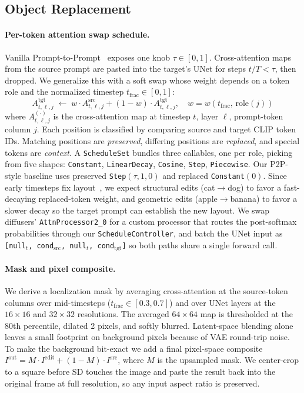 \documentclass[10pt,twocolumn,letterpaper]{article}
\begin{document}
\subsection{Object Replacement}
\label{sec:replace}

\paragraph{Per-token attention swap schedule.}
Vanilla Prompt-to-Prompt~\cite{hertz2022p2p} exposes one knob $\tau \in [0, 1]$. Cross-attention maps from the source prompt are pasted into the target's UNet for steps $t/T < \tau$, then dropped. We generalize this with a soft swap whose weight depends on a token role and the normalized timestep $t_{\text{frac}} \in [0, 1]$:
\begin{equation}
    A^{\text{tgt}}_{t, \ell, j} \;\leftarrow\; w \cdot A^{\text{src}}_{t, \ell, j} + (1 - w) \cdot A^{\text{tgt}}_{t, \ell, j}, \quad w = w(t_{\text{frac}}, \, \text{role}(j))
\label{eq:blend}
\end{equation}
where $A^{(\cdot)}_{t, \ell, j}$ is the cross-attention map at timestep $t$, layer $\ell$, prompt-token column $j$. Each position is classified by comparing source and target CLIP token IDs. Matching positions are \emph{preserved}, differing positions are \emph{replaced}, and special tokens are \emph{context}. A \texttt{ScheduleSet} bundles three callables, one per role, picking from five shapes: \texttt{Constant}, \texttt{LinearDecay}, \texttt{Cosine}, \texttt{Step}, \texttt{Piecewise}. Our P2P-style baseline uses preserved \texttt{Step}$(\tau, 1, 0)$ and replaced \texttt{Constant}$(0)$. Since early timesteps fix layout~\cite{hertz2022p2p}, we expect structural edits (cat$\to$dog) to favor a fast-decaying replaced-token weight, and geometric edits (apple$\to$banana) to favor a slower decay so the target prompt can establish the new layout. We swap diffusers' \texttt{AttnProcessor2\_0} for a custom processor that routes the post-softmax probabilities through our \texttt{ScheduleController}, and batch the UNet input as \texttt{[null$_t$, cond$_{\text{src}}$, null$_t$, cond$_{\text{tgt}}$]} so both paths share a single forward call.

\paragraph{Mask and pixel composite.}
We derive a localization mask by averaging cross-attention at the source-token columns over mid-timesteps ($t_{\text{frac}} \in [0.3, 0.7]$) and over UNet layers at the $16{\times}16$ and $32{\times}32$ resolutions. The averaged $64{\times}64$ map is thresholded at the 80th percentile, dilated 2 pixels, and softly blurred. Latent-space blending alone leaves a small footprint on background pixels because of VAE round-trip noise. To make the background bit-exact we add a final pixel-space composite $I^{\text{out}} = M \cdot I^{\text{edit}} + (1 - M) \cdot I^{\text{src}}$, where $M$ is the upsampled mask. We center-crop to a square before SD touches the image and paste the result back into the original frame at full resolution, so any input aspect ratio is preserved.
\end{document}
